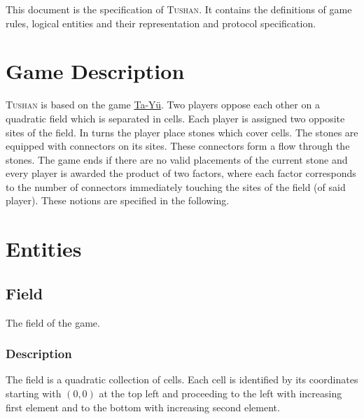 \documentclass{scrartcl}
\newcommand{\tushan}{\textsc{Tushan}}
\begin{document}
This document is the specification of \tushan{}. It contains the 
definitions of game rules, logical entities and their representation and 
protocol specification.

\section{Game Description}
\tushan{} is based on the game 
\href{https://en.wikipedia.org/wiki/Ta\_Y\%C3\%BC}{Ta-Yü}. Two players
oppose each other on a quadratic field which is separated in cells. Each player 
is assigned two opposite sites of the field. In turns the player place stones
which cover cells. The stones are equipped with connectors on its sites. These
connectors form a flow through the stones. The game ends if there are no valid
placements of the current stone and every player is awarded the product of two
factors, where each factor corresponds to the number of connectors immediately
touching the sites of the field (of said player). These notions are specified
in the following.

\section{Entities}
\subsection{Field}
The field of the game.
\subsubsection{Description}
The field is a quadratic collection of cells. Each cell is identified by its 
coordinates starting with $(0,0)$ at the top left and proceeding to the left 
with increasing first element and to the bottom with increasing second element.
\end{document}
